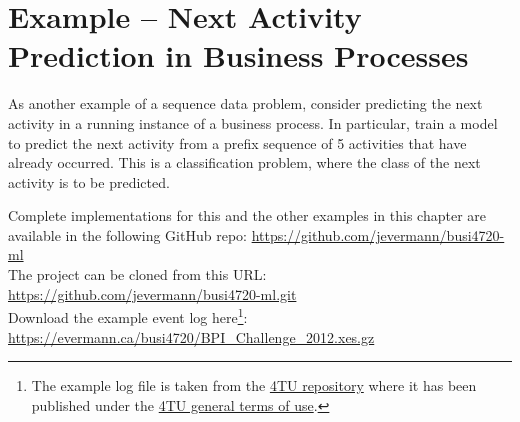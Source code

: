 \section{Example -- Next Activity Prediction in Business Processes}

As another example of a sequence data problem, consider predicting the next activity in a running instance of a business process. In particular, train a model to predict the next activity from a prefix sequence of 5 activities that have already occurred. This is a classification problem, where the class of the next activity is to be predicted. 

\begin{resourcebox}
Complete implementations for this and the other examples in this chapter are available in the following GitHub repo: \normalsize\url{https://github.com/jevermann/busi4720-ml}\normalsize \\

The project can be cloned from this URL: \normalsize\url{https://github.com/jevermann/busi4720-ml.git}\normalsize \\

Download the example event log here\footnote{
The example log file is taken from the \href{
https://doi.org/10.4121/uuid:3926db30-f712-4394-aebc-75976070e91f}{4TU repository} where it has been published under the \href{ https://data.4tu.nl/articles/_/12721292/1}{4TU general terms of use}.
}: \url{https://evermann.ca/busi4720/BPI_Challenge_2012.xes.gz}
\end{resourcebox}

